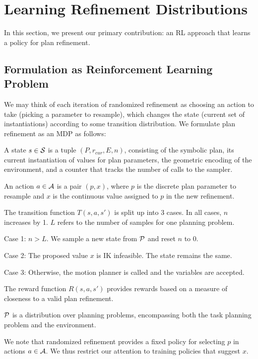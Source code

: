 \section{Learning Refinement Distributions}
In this section, we present our primary contribution: an RL
approach that learns a policy for plan refinement.

\subsection{Formulation as Reinforcement Learning Problem}
We may think of each iteration of randomized refinement as choosing an action to take
(picking a parameter to resample), which changes the state (current set of instantiations)
according to some transition distribution. We formulate plan refinement as an MDP as follows:
\begin{tightlist}
\item A state $s \in \mathcal{S}$ is a tuple $(P, r_{cur}, E, n)$, consisting of the
symbolic plan, its current instantiation of values for plan parameters,
the geometric encoding of the environment, and a counter that tracks
the number of calls to the sampler.
\item An action $a \in \mathcal{A}$ is a pair $(p, x)$, where $p$ is the discrete plan
parameter to resample and $x$ is the continuous value assigned to $p$ in the new refinement.
\item The transition function $T(s, a, s')$ is split up into 3 cases. In all cases, $n$ increases by 1. $L$ refers to
the number of samples for one planning problem.
  \begin{tightlist}
  \item Case 1: $n > L$. We sample a new state from $\mathcal{P}$ and reset $n$ to 0.
  \item Case 2: The proposed value $x$ is IK infeasible. The state remains the same.
  \item Case 3: Otherwise, the motion planner is called and the variables are accepted.
  \end{tightlist}
\item The reward function $R(s, a, s')$ provides rewards based on a measure of closeness to a valid plan refinement.
\item $\mathcal{P}$ is a distribution over planning problems, encompassing both the task planning problem
and the environment.
\end{tightlist}

We note that randomized refinement provides a fixed policy for selecting $p$ in actions $a \in \mathcal{A}$.
We thus restrict our attention to training policies that suggest $x$.

